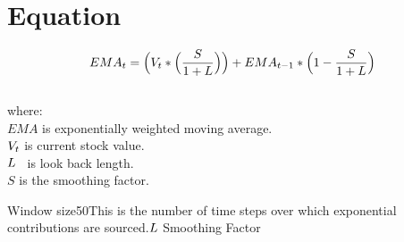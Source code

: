 \documentclass{article}
\begin{document}
\logo
{} %
\tblofcontents


\section{Equation}
\begin{equation}
    EMA_{t} = \Big(V_{t} * \Big(\frac{S}{1 + L}\Big)\Big) + EMA_{t-1} * \Big(1-\frac{S}{1 + L}\Big)
\end{equation}
\\

where: \\

$EMA$ is exponentially weighted moving average. \\

$V_{t}$ is current stock value. \\

$L$ \ is look back length. \\

$S$ is the smoothing factor.


{Window size}{50}{This is the number of time steps over which exponential contributions are sourced.}{$L$}
{Smoothing Factor}{}
\stoptable

\keyterms
\furtherlinks
\end{document}
